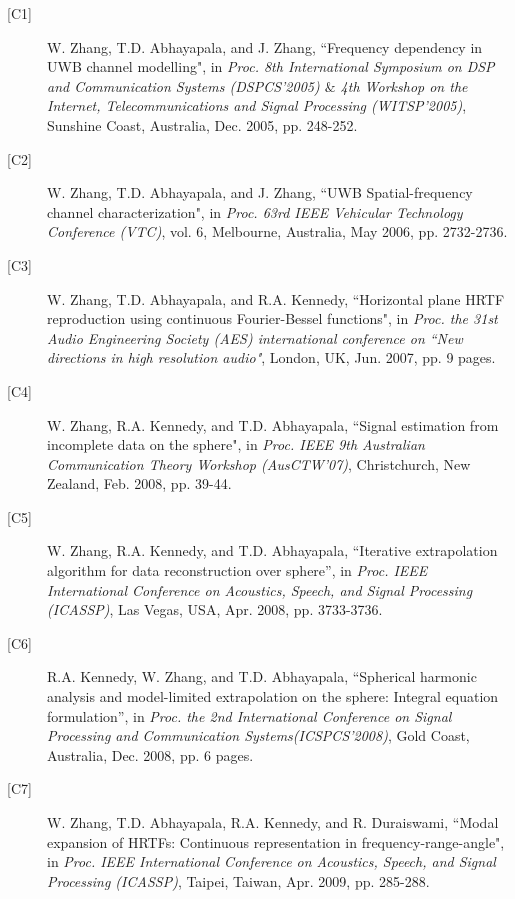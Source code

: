 \documentclass[10pt]{article}
\begin{document}
\begin{description}

\item[{[}C1{]}]W. Zhang, T.D. Abhayapala, and J. Zhang, ``Frequency dependency in UWB channel modelling", in \emph{Proc. 8th International Symposium on DSP and Communication Systems (DSPCS'2005) $\&$ 4th Workshop on the Internet, Telecommunications and Signal
Processing (WITSP'2005)}, Sunshine Coast, Australia, Dec. 2005, pp. 248-252.

\item[{[}C2{]}]W. Zhang, T.D. Abhayapala, and J. Zhang, ``UWB Spatial-frequency channel characterization",
in \emph{Proc. 63rd IEEE Vehicular Technology Conference (VTC)}, vol. 6, Melbourne, Australia, May 2006, pp. 2732-2736.

\item[{[}C3{]}]W. Zhang, T.D. Abhayapala, and R.A. Kennedy, ``Horizontal plane HRTF reproduction using continuous Fourier-Bessel functions",
in \emph{Proc. the 31st Audio Engineering Society (AES) international conference on ``New directions in high resolution audio"}, London, UK,
Jun. 2007, pp. 9 pages.

\item[{[}C4{]}]W. Zhang, R.A. Kennedy, and T.D. Abhayapala, ``Signal estimation from incomplete data on the sphere",
in \emph{Proc. IEEE 9th Australian Communication Theory Workshop (AusCTW'07)}, Christchurch, New Zealand, Feb. 2008, pp. 39-44.

\item[{[}C5{]}]W. Zhang, R.A. Kennedy, and T.D. Abhayapala, ``Iterative extrapolation algorithm for data reconstruction over sphere'',
in \emph{Proc. IEEE International Conference on Acoustics, Speech, and Signal Processing (ICASSP)}, Las Vegas, USA, Apr. 2008, pp. 3733-3736.

\item[{[}C6{]}]R.A. Kennedy, W. Zhang, and T.D. Abhayapala, ``Spherical harmonic analysis and model-limited
extrapolation on the sphere: Integral equation formulation'', in \emph{Proc. the 2nd International Conference on Signal Processing and
Communication Systems(ICSPCS'2008)}, Gold Coast, Australia, Dec. 2008, pp. 6 pages.

\item[{[}C7{]}]W. Zhang, T.D. Abhayapala, R.A. Kennedy, and R. Duraiswami, ``Modal expansion of HRTFs:
Continuous representation in frequency-range-angle", in \emph{Proc. IEEE International Conference on Acoustics, Speech, and Signal Processing
(ICASSP)}, Taipei, Taiwan, Apr. 2009, pp. 285-288.


\end{description}
\end{document}
